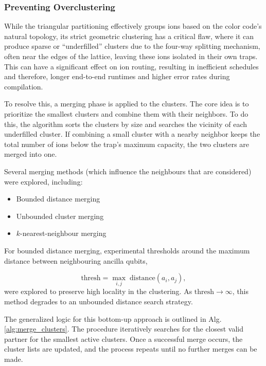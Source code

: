\subsubsection{Preventing Overclustering}

While the triangular partitioning effectively groups ions based on the color code's natural topology, its strict geometric clustering has a critical flaw, where it can produce sparse or ``underfilled'' clusters due to the four-way splitting mechanism, often near the edges of the lattice, leaving these ions isolated in their own traps. This can have a significant effect on ion routing, resulting in inefficient schedules and therefore, longer end-to-end runtimes and higher error rates during compilation.

To resolve this, a merging phase is applied to the clusters. The core idea is to prioritize the smallest clusters and combine them with their neighbors. To do this, the algorithm sorts the clusters by size and searches the vicinity of each underfilled cluster. If combining a small cluster with a nearby neighbor keeps the total number of ions below the trap's maximum capacity, the two clusters are merged into one.

Several merging methods (which influence the neighbours that are considered) were explored, including:
\begin{itemize}
    \item Bounded distance merging
    \item Unbounded cluster merging
    \item $k$-nearest-neighbour merging
\end{itemize}

For bounded distance merging, experimental thresholds around the maximum distance between neighbouring ancilla qubits, 

\begin{equation}
    \text{thresh} = \max_{i,j}\; \text{distance}(a_i, a_j),  
\end{equation}
were explored to preserve high locality in the clustering. As $\text{thresh} \rightarrow \infty$, this method degrades to an unbounded distance search strategy. 

The generalized logic for this bottom-up approach is outlined in Alg. \ref{alg:merge_clusters}. The procedure iteratively searches for the closest valid partner for the smallest active clusters. Once a successful merge occurs, the cluster lists are updated, and the process repeats until no further merges can be made.
 
